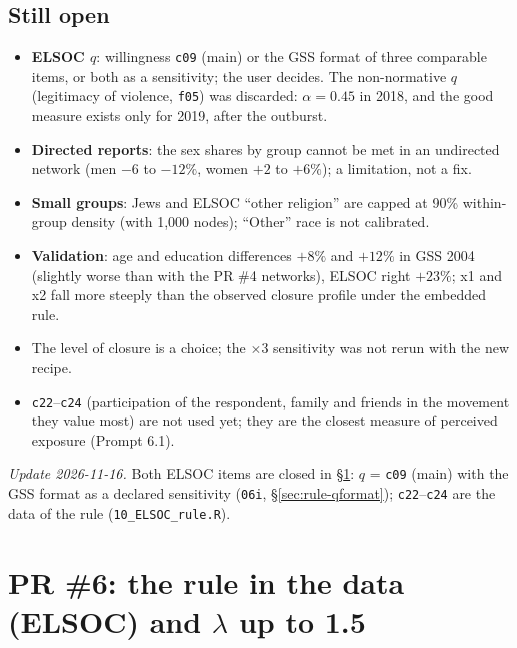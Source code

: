 \documentclass[11pt,a4paper]{article}
\newcommand{\code}[1]{\texttt{#1}}
\begin{document}
\subsection{Still open}
\label{sec:pr5open}

\begin{itemize}
  \item \textbf{ELSOC $q$}: willingness \code{c09} (main) or the GSS format of three comparable items, or
    both as a sensitivity; the user decides. The non-normative $q$ (legitimacy of violence, \code{f05}) was
    discarded: $\alpha = 0.45$ in 2018, and the good measure exists only for 2019, after the outburst.
  \item \textbf{Directed reports}: the sex shares by group cannot be met in an undirected network (men
    $-6$ to $-12\%$, women $+2$ to $+6\%$); a limitation, not a fix.
  \item \textbf{Small groups}: Jews and ELSOC ``other religion'' are capped at 90\% within-group density
    (with 1{,}000 nodes); ``Other'' race is not calibrated.
  \item \textbf{Validation}: age and education differences $+8\%$ and $+12\%$ in GSS 2004 (slightly worse
    than with the PR \#4 networks), ELSOC right $+23\%$; x1 and x2 fall more steeply than the observed
    closure profile under the embedded rule.
  \item The level of closure is a choice; the $\times 3$ sensitivity was not rerun with the new recipe.
  \item \code{c22}--\code{c24} (participation of the respondent, family and friends in the movement they
    value most) are not used yet; they are the closest measure of perceived exposure (Prompt 6.1).
\end{itemize}
\noindent\emph{Update 2026-11-16.} Both ELSOC items are closed in \S\ref{sec:rule-data}: $q$ = \code{c09}
(main) with the GSS format as a declared sensitivity (\code{06i}, \S\ref{sec:rule-qformat}); \code{c22}--\code{c24}
are the data of the rule (\code{10\_ELSOC\_rule.R}).

\section{PR \#6: the rule in the data (ELSOC) and \texorpdfstring{$\lambda$}{lambda} up to 1.5}
\label{sec:rule-data}
\end{document}
